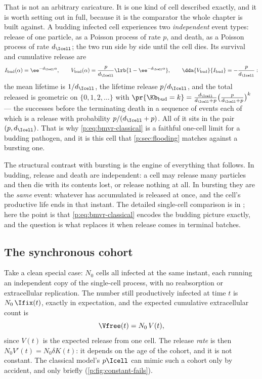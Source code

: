 That is not an arbitrary caricature. It is one kind of cell described
exactly, and it is worth setting out in full, because it is the comparator
the whole chapter is built against. A budding infected cell experiences two \emph{independent} event
types: release of one particle, as a Poisson process of rate $p$, and death,
as a Poisson process of rate $d_{\Icell}$; the two run side by side until
the cell dies. Its survival and cumulative release are
\begin{equation}
I_{\rm bud}(\alpha)=\ee^{-d_{\Icell}\alpha},\qquad
V_{\rm bud}(\alpha)=\frac{p}{d_{\Icell}}\lrb{1-\ee^{-d_{\Icell}\alpha}},
\qquad
\dda{V_{\rm bud}}{I_{\rm bud}}=-\frac{p}{d_{\Icell}}:
\label{p:eq:bud-cell}
\end{equation}
the mean lifetime is $1/d_{\Icell}$, the lifetime release $p/d_{\Icell}$,
and the total released is geometric on $\{0,1,2,\ldots\}$ with
$\pr{\Kb_{\rm bud}=k}=\frac{d_{\Icell}}{d_{\Icell}+p}
\bigl(\frac{p}{d_{\Icell}+p}\bigr)^k$ --- the successes before the
terminating death in a sequence of events each of which is a release with
probability $p/(d_{\Icell}+p)$. All of it sits in the pair $(p,d_{\Icell})$. That is why
\cref{p:eq:bmvr-classical} is a faithful one-cell limit for a budding
pathogen, and it is this cell that \cref{p:sec:flooding} matches against a
bursting one.

The structural contrast with bursting is the engine of everything that
follows. In budding, release and death are independent: a cell may release
many particles and then die with its contents lost, or release nothing at
all. In bursting they are the \emph{same} event: whatever has accumulated is
released at once, and the cell's productive life ends in that instant. The
detailed single-cell comparison is in \ChDist{}; here the point is that
\cref{p:eq:bmvr-classical} encodes the budding picture exactly, and the
question is what replaces it when release comes in terminal batches.

\subsection{The synchronous cohort}
\label{p:sec:cohort}

Take a clean special case: $N_0$ cells all infected at the same instant,
each running an independent copy of the single-cell process, with no
reabsorption or extracellular replication. The number still productively
infected at time $t$ is $N_0\,\Ifix(t)$, exactly in expectation, and the
expected cumulative extracellular count is
\begin{equation}
\Vfree(t)=N_0\,V(t),
\label{p:eq:cohort}
\end{equation}
since $V(t)$ is the expected release from one cell. The release \emph{rate}
is then $N_0V'(t)=N_0\delta K(t)$: it depends on the age of the cohort, and
it is not constant. The classical model's $p\Icell$ can mimic such a cohort
only by accident, and only briefly (\cref{p:fig:constant-fails}).


